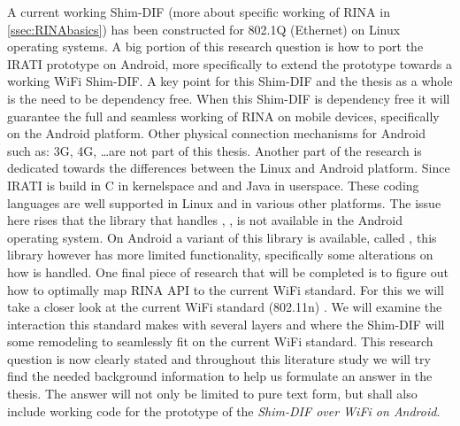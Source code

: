 A current working Shim-DIF (more about specific working of RINA in \ref{ssec:RINAbasics}) has been constructed for 802.1Q (Ethernet) on Linux operating systems. A big portion of this research question is how to port the IRATI prototype on Android, more specifically to extend the prototype towards a working WiFi Shim-DIF. A key point for this Shim-DIF and the thesis as a whole is the need to be dependency free. When this Shim-DIF is dependency free it will guarantee the full and seamless working of RINA on mobile devices, specifically on the Android platform. Other physical connection mechanisms for Android such as: 3G, 4G, \ldots are not part of this thesis.
\npar
Another part of the research is dedicated towards the differences between the Linux and Android platform. Since IRATI is build in C in kernelspace and \cpp and Java in userspace.  These coding languages are well supported in Linux and in various other platforms. The issue here rises that the library that handles \cpp, , is not available in the Android operating system. On Android a variant of this library is available, called , this library however has more limited functionality, specifically some alterations on how \cpp is handled.
\npar
One final piece of research that will be completed is to figure out how to optimally map RINA API to the current WiFi standard. For this we will take a closer look at the current WiFi standard (802.11n) \citep{eldadperahia2008, sixtoortiz2009, thomaspaul2008}. We will examine the interaction this standard makes with several layers and where the Shim-DIF will some remodeling to seamlessly fit on the current WiFi standard.
\npar
This research question is now clearly stated and throughout this literature study we will try find the needed background information to help us formulate an answer in the thesis. The answer will not only be limited to pure text form, but shall also include working code for the prototype of the \emph{Shim-DIF over WiFi on Android}. 


